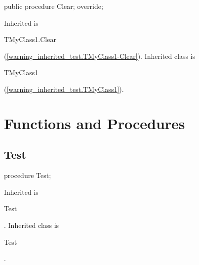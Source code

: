 \documentclass{report}
\newif\ifpdf
\begin{document}
\label{warning_inherited_test.TMyClass2-Clear}
\begin{list}{}{
\setlength{\itemindent}{0cm}
\setlength{\listparindent}{0cm}
\setlength{\leftmargin}{\evensidemargin}
\addtolength{\leftmargin}{\tmplength}
\settowidth{\labelsep}{X}
\addtolength{\leftmargin}{\labelsep}
\setlength{\labelwidth}{\tmplength}
}
\item[\textbf{Declaration}\hfill]
\ifpdf
\begin{flushleft}
\fi
\begin{ttfamily}
public procedure Clear; override;\end{ttfamily}

\ifpdf
\end{flushleft}
\fi

\par
\item[\textbf{Description}]
Inherited is \begin{ttfamily}TMyClass1.Clear\end{ttfamily}(\ref{warning_inherited_test.TMyClass1-Clear}). Inherited class is \begin{ttfamily}TMyClass1\end{ttfamily}(\ref{warning_inherited_test.TMyClass1}).

\end{list}
\section{Functions and Procedures}
\ifpdf
\subsection*{\large{\textbf{Test}}\normalsize\hspace{1ex}\hrulefill}
\else
\subsection*{Test}
\fi
\label{warning_inherited_test-Test}
\begin{list}{}{
\setlength{\itemindent}{0cm}
\setlength{\listparindent}{0cm}
\setlength{\leftmargin}{\evensidemargin}
\addtolength{\leftmargin}{\tmplength}
\settowidth{\labelsep}{X}
\addtolength{\leftmargin}{\labelsep}
\setlength{\labelwidth}{\tmplength}
}
\item[\textbf{Declaration}\hfill]
\ifpdf
\begin{flushleft}
\fi
\begin{ttfamily}
procedure Test;\end{ttfamily}

\ifpdf
\end{flushleft}
\fi

\par
\item[\textbf{Description}]
Inherited is \begin{ttfamily}Test\end{ttfamily}. Inherited class is \begin{ttfamily}Test\end{ttfamily}.

\end{list}
\end{document}

